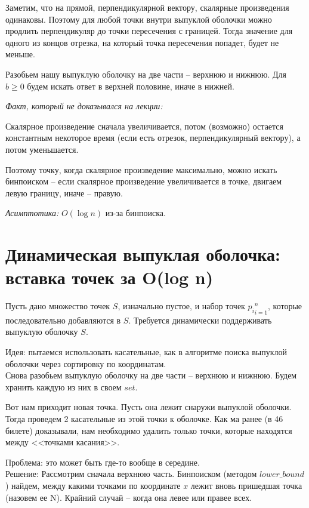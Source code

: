 \Proof
Заметим, что на прямой, перпендикулярной вектору, скалярные произведения одинаковы. Поэтому для любой точки внутри выпуклой оболочки можно продлить перпендикуляр до точки пересечения с границей. Тогда значение для одного из концов отрезка, на который точка пересечения попадет, будет не меньше.

\EndProof

Разобьем нашу выпуклую оболочку на две части -- верхнюю и нижнюю. Для $b \geq 0$ будем искать ответ в верхней половине, иначе в нижней. 

\textit{Факт, который не доказывался на лекции:}

Скалярное произведение сначала увеличивается, потом (возможно) остается константным некоторое время (если есть отрезок, перпендикулярный вектору), а потом уменьшается.

Поэтому точку, когда скалярное произведение максимально, можно искать бинпоиском -- если скалярное произведение увеличивается в точке, двигаем левую границу, иначе -- правую.

\textit{Асимптотика:} $O(\log n)$ из-за бинпоиска.
\newpage{}

\section{Динамическая выпуклая оболочка: вставка точек за O(log n)}

Пусть дано множество точек $S$, изначально пустое, и набор точек ${p_i}^n_{i=1}$, которые последовательно добавляются в $S$. Требуется динамически поддерживать выпуклую оболочку $S$.

Идея: пытаемся использовать касательные, как в алгоритме поиска выпуклой оболочки через сортировку по координатам.\\

Снова разобьем выпуклую оболочку на две части -- верхнюю и нижнюю. Будем хранить каждую из них в своем $set$.

Вот нам приходит новая точка. Пусть она лежит снаружи выпуклой оболочки. Тогда проведем 2 касательные из этой точки к оболочке. Как ма ранее (в 46 билете) доказывали, нам необходимо удалить только точки, которые находятся между <<точками касания>>. 

Проблема: это может быть где-то вообще в середине.\\

Решение: Рассмотрим сначала верхнюю часть. Бинпоиском (методом $lower\_bound$) найдем, между какими точками по координате $x$ лежит вновь пришедшая точка (назовем ее N). Крайний случай -- когда она левее или правее всех.\\ 

